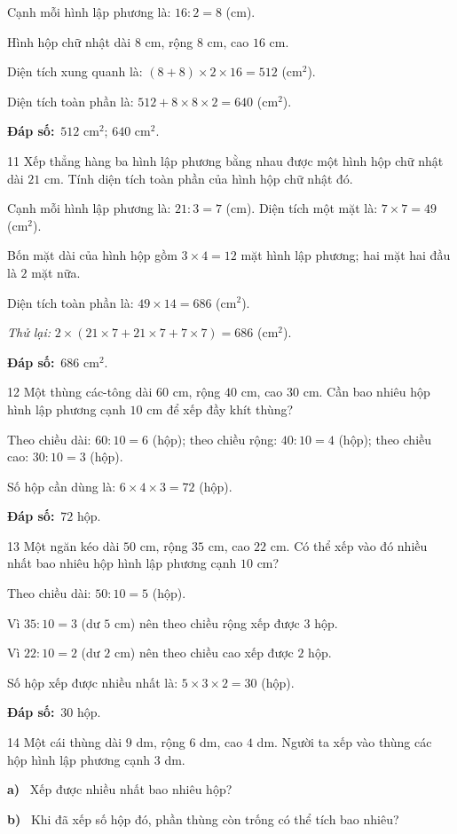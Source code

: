 \documentclass[11pt]{article}
\newif\ifsol \solfalse
\providecommand{\AnsWord}{Đáp số}
\newcommand{\dapso}[1]{\par\textbf{\AnsWord:}\ #1}
\newcommand{\probsol}[1]{%
  \begin{lrbox}{\solmeasure}\begin{minipage}{\dimexpr\linewidth-24pt\relax}#1\end{minipage}\end{lrbox}%
  \ifsol
    \begin{solbox}#1\end{solbox}%
  \else
    \setlength{\solht}{\dimexpr\ht\solmeasure+\dp\solmeasure+0.85cm\relax}%
    \ifdim\solht<1.35cm\setlength{\solht}{1.35cm}\fi
    \begin{tcolorbox}[colback=white,colframe=Line,boxrule=0.8pt,arc=5pt,
      left=8pt,right=8pt,top=4pt,bottom=4pt,height=\solht]{\footnotesize\color{Slate}\itshape\WorkWord}\end{tcolorbox}%
  \fi}
\newcommand{\pa}[1]{\textbf{#1)}\ }
\newcommand{\gap}{\vspace{0.3cm}}
\def\WorkWord{Bài làm:}
\def\AnsWord{Đáp số}
\begin{document}
\probsol{
Cạnh mỗi hình lập phương là: $16:2=8$ (cm).\par
Hình hộp chữ nhật dài $8$ cm, rộng $8$ cm, cao $16$ cm.\par
Diện tích xung quanh là: $(8+8)\times2\times16=512$ (cm$^2$).\par
Diện tích toàn phần là: $512+8\times8\times2=640$ (cm$^2$).
\dapso{$512$ cm$^2$; $640$ cm$^2$.}}
\gap
\begin{probbox}{11}{\relax}
Xếp thẳng hàng ba hình lập phương bằng nhau được một hình hộp chữ nhật dài $21$ cm. Tính diện tích toàn phần của hình hộp chữ nhật đó.
\end{probbox}
\probsol{
Cạnh mỗi hình lập phương là: $21:3=7$ (cm). Diện tích một mặt là: $7\times7=49$ (cm$^2$).\par
Bốn mặt dài của hình hộp gồm $3\times4=12$ mặt hình lập phương; hai mặt hai đầu là $2$ mặt nữa.\par
Diện tích toàn phần là: $49\times14=686$ (cm$^2$).\par
\emph{Thử lại:} $2\times(21\times7+21\times7+7\times7)=686$ (cm$^2$).
\dapso{$686$ cm$^2$.}}
\gap
\begin{probbox}{12}{\relax}
Một thùng các-tông dài $60$ cm, rộng $40$ cm, cao $30$ cm. Cần bao nhiêu hộp hình lập phương cạnh $10$ cm để xếp đầy khít thùng?
\end{probbox}
\probsol{
Theo chiều dài: $60:10=6$ (hộp); theo chiều rộng: $40:10=4$ (hộp); theo chiều cao: $30:10=3$ (hộp).\par
Số hộp cần dùng là: $6\times4\times3=72$ (hộp).
\dapso{$72$ hộp.}}
\gap
\begin{probbox}{13}{\relax}
Một ngăn kéo dài $50$ cm, rộng $35$ cm, cao $22$ cm. Có thể xếp vào đó nhiều nhất bao nhiêu hộp hình lập phương cạnh $10$ cm?
\end{probbox}
\probsol{
Theo chiều dài: $50:10=5$ (hộp).\par
Vì $35:10=3$ (dư $5$ cm) nên theo chiều rộng xếp được $3$ hộp.\par
Vì $22:10=2$ (dư $2$ cm) nên theo chiều cao xếp được $2$ hộp.\par
Số hộp xếp được nhiều nhất là: $5\times3\times2=30$ (hộp).
\dapso{$30$ hộp.}}
\gap
\begin{probbox}{14}{\relax}
Một cái thùng dài $9$ dm, rộng $6$ dm, cao $4$ dm. Người ta xếp vào thùng các hộp hình lập phương cạnh $3$ dm.\par
\pa{a} Xếp được nhiều nhất bao nhiêu hộp?\par
\pa{b} Khi đã xếp số hộp đó, phần thùng còn trống có thể tích bao nhiêu?
\end{probbox}
\end{document}
